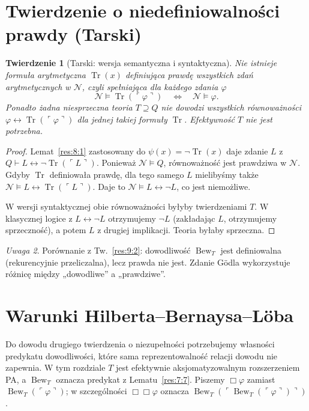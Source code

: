 \documentclass[11pt,a4paper]{article}
\numberwithin{equation}{section}
\theoremstyle{plain}
\newtheorem{twierdzenie}{Twierdzenie}[section]
\theoremstyle{definition}
\theoremstyle{remark}
\newtheorem{uwaga}[twierdzenie]{Uwaga}
\begin{document}
\section{Twierdzenie o niedefiniowalności prawdy (Tarski)}\label{sec:tarski}
\begin{twierdzenie}[Tarski: wersja semantyczna i syntaktyczna]\label{res:10:1}
Nie istnieje formuła arytmetyczna $\operatorname{Tr}(x)$ definiująca prawdę wszystkich zdań arytmetycznych w $\mathcal N$, czyli spełniająca dla każdego zdania $\varphi$
\[
\mathcal N\models\operatorname{Tr}(\ulcorner\varphi\urcorner)\quad\Longleftrightarrow\quad\mathcal N\models\varphi.
\]
Ponadto żadna niesprzeczna teoria $T\supseteq Q$ nie dowodzi wszystkich równoważności $\varphi\leftrightarrow\operatorname{Tr}(\ulcorner\varphi\urcorner)$ dla jednej takiej formuły $\operatorname{Tr}$. Efektywność $T$ nie jest potrzebna.
\end{twierdzenie}
\begin{proof}
Lemat~\ref{res:8:1} zastosowany do $\psi(x)=\neg\operatorname{Tr}(x)$ daje zdanie $L$ z $Q\vdash L\leftrightarrow\neg\operatorname{Tr}(\ulcorner L\urcorner)$. Ponieważ $\mathcal N\models Q$, równoważność jest prawdziwa w $\mathcal N$. Gdyby $\operatorname{Tr}$ definiowała prawdę, dla tego samego $L$ mielibyśmy także $\mathcal N\models L\leftrightarrow\operatorname{Tr}(\ulcorner L\urcorner)$. Daje to $\mathcal N\models L\leftrightarrow\neg L$, co jest niemożliwe.

W wersji syntaktycznej obie równoważności byłyby twierdzeniami $T$. W klasycznej logice z $L\leftrightarrow\neg L$ otrzymujemy $\neg L$ (zakładając $L$, otrzymujemy sprzeczność), a potem $L$ z drugiej implikacji. Teoria byłaby sprzeczna.
\end{proof}

\begin{uwaga}\label{res:10:2}
Porównanie z Tw.~\ref{res:9:2}: dowodliwość $\operatorname{Bew}_T$ jest definiowalna (rekurencyjnie przeliczalna), lecz prawda nie jest. Zdanie Gödla wykorzystuje różnicę między „dowodliwe” a „prawdziwe”.
\end{uwaga}

\section{Warunki Hilberta--Bernaysa--Löba}\label{sec:warunki-hbl}
Do dowodu drugiego twierdzenia o niezupełności potrzebujemy własności predykatu dowodliwości, które sama reprezentowalność relacji dowodu nie zapewnia. W tym rozdziale $T$ jest efektywnie aksjomatyzowalnym rozszerzeniem PA, a $\operatorname{Bew}_T$ oznacza predykat z Lematu~\ref{res:7:7}. Piszemy $\Box\varphi$ zamiast $\operatorname{Bew}_T(\ulcorner\varphi\urcorner)$; w szczególności $\Box\Box\varphi$ oznacza $\operatorname{Bew}_T(\ulcorner\operatorname{Bew}_T(\ulcorner\varphi\urcorner)\urcorner)$.
\end{document}
